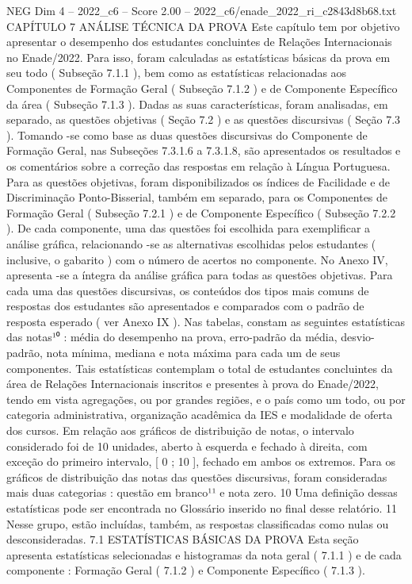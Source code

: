 \begin{textsample}{NEG Dim 4 – 2022\_c6 – Score 2.00 – 2022\_c6/enade\_2022\_ri\_c2843d8b68.txt}  \label{ex:f4_neg_277}
CAPÍTULO 7 ANÁLISE TÉCNICA DA PROVA Este capítulo tem por objetivo apresentar o desempenho dos estudantes concluintes de Relações Internacionais no Enade/2022.
Para isso, foram calculadas as estatísticas básicas da prova em seu todo ( Subseção 7.1.1 ), bem como as estatísticas relacionadas aos Componentes de Formação Geral ( Subseção 7.1.2 ) e de Componente Específico da área ( Subseção 7.1.3 ).
Dadas as suas características, foram analisadas, em separado, as questões objetivas ( Seção 7.2 ) e as questões discursivas ( Seção 7.3 ).
Tomando -se como base as duas questões discursivas do Componente de Formação Geral, nas Subseções 7.3.1.6 a 7.3.1.8, são apresentados os resultados e os comentários sobre a correção das respostas em relação à Língua Portuguesa.
Para as questões objetivas, foram disponibilizados os índices de Facilidade e de Discriminação Ponto-Bisserial, também em separado, para os Componentes de Formação Geral ( Subseção 7.2.1 ) e de Componente Específico ( Subseção 7.2.2 ).
De cada componente, uma das questões foi escolhida para exemplificar a análise gráfica, relacionando -se as alternativas escolhidas pelos estudantes ( inclusive, o gabarito ) com o número de acertos no componente.
No Anexo IV, apresenta -se a íntegra da análise gráfica para todas as questões objetivas.
Para cada uma das questões discursivas, os conteúdos dos tipos mais comuns de respostas dos estudantes são apresentados e comparados com o padrão de resposta esperado ( ver Anexo IX ).
Nas tabelas, constam as seguintes estatísticas das notas¹⁰ : média do desempenho na prova, erro-padrão da média, desvio-padrão, nota mínima, mediana e nota máxima para cada um de seus componentes.
Tais estatísticas contemplam o total de estudantes concluintes da área de Relações Internacionais inscritos e presentes à prova do Enade/2022, tendo em vista agregações, ou por grandes regiões, e o país como um todo, ou por categoria administrativa, organização acadêmica da IES e modalidade de oferta dos cursos.
Em relação aos gráficos de distribuição de notas, o intervalo considerado foi de 10 unidades, aberto à esquerda e fechado à direita, com exceção do primeiro intervalo, [ 0 ; 10 ], fechado em ambos os extremos.
Para os gráficos de distribuição das notas das questões discursivas, foram consideradas mais duas categorias : questão em branco¹¹ e nota zero. 10 Uma definição dessas estatísticas pode ser encontrada no Glossário inserido no final desse relatório. 11 Nesse grupo, estão incluídas, também, as respostas classificadas como nulas ou desconsideradas. 7.1 ESTATÍSTICAS BÁSICAS DA PROVA Esta seção apresenta estatísticas selecionadas e histogramas da nota geral ( 7.1.1 ) e de cada componente : Formação Geral ( 7.1.2 ) e Componente Específico ( 7.1.3 ).

\end{textsample}
